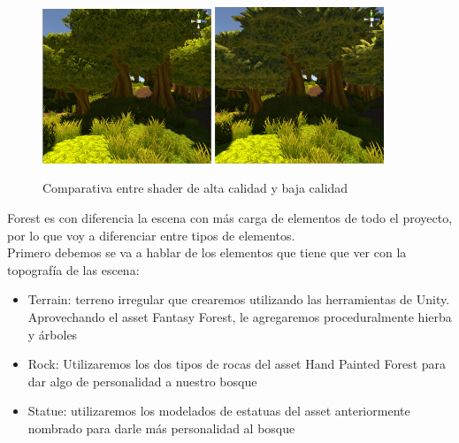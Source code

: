 \begin{figure}[htb]
	\centering
	\includegraphics[width=0.45\textwidth]{./imagenes/highShadders}
	\includegraphics[width=0.45\textwidth]{./imagenes/lowShadders}
	\caption{Comparativa entre shader de alta calidad y baja calidad}
\end{figure}
\FloatBarrier


\quad Forest es con diferencia la escena con más carga de elementos de todo el proyecto, por lo que voy a diferenciar entre tipos de elementos.\\

\quad Primero debemos se va a hablar de los elementos que tiene que ver con la topografía de las escena:

\begin{itemize}
	\item Terrain: terreno irregular que crearemos utilizando las herramientas de Unity. Aprovechando el asset Fantasy Forest, le agregaremos proceduralmente hierba y árboles
	\item Rock: Utilizaremos los dos tipos de rocas del asset Hand Painted Forest para dar algo de personalidad a nuestro bosque
	\item Statue: utilizaremos los modelados de estatuas del asset anteriormente nombrado para darle más personalidad al bosque
\end{itemize}


